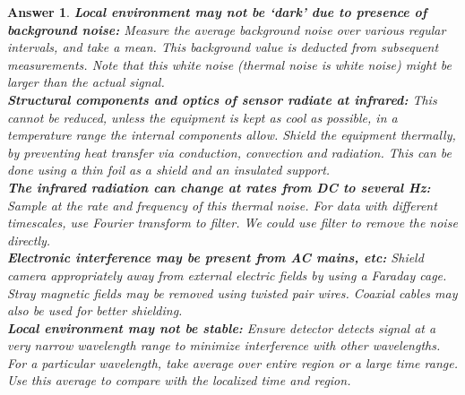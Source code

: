 \documentclass[a4paper]{article}
\newtheorem{ans}{Answer}[section]
\theoremstyle{new}
\begin{document}
\begin{ans}
\textbf{Local environment may not be `dark' due to presence of background noise:} Measure the average background noise over various regular intervals, and take a mean. This background value is deducted from subsequent measurements. Note that this white noise (thermal noise is white noise) might be larger than the actual signal.\\[5pt]
\textbf{Structural components and optics of sensor radiate at infrared:} This cannot be reduced, unless the equipment is kept as cool as possible, in a temperature range the internal components allow. Shield the equipment thermally, by preventing heat transfer via conduction, convection and radiation. This can be done using a thin foil as a shield and an insulated support.\\[5pt]
\textbf{The infrared radiation can change at rates from DC to several Hz:} Sample at the rate and frequency of this thermal noise. For data with different timescales, use Fourier transform to filter. We could use filter to remove the noise directly.\\[5pt]
\textbf{Electronic interference may be present from AC mains, etc: } Shield camera appropriately away from external electric fields by using a Faraday cage. Stray magnetic fields may be removed using twisted pair wires. Coaxial cables may also be used for better shielding.\\[5pt]
\textbf{Local environment may not be stable:} Ensure detector detects signal at a very narrow wavelength range to minimize interference with other wavelengths. For a  particular wavelength, take average over entire region or a large time range. Use this average to compare with the localized time and region.
\end{ans}
\newpage
\end{document}
